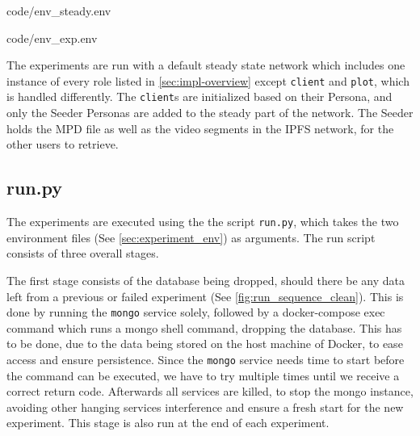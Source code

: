\noindent\begin{minipage}[t]{.40\textwidth}

                {code/env_steady.env}
\end{minipage}
\hfill
\begin{minipage}[t]{.51\textwidth}

                {code/env_exp.env}
\end{minipage}\bigskip

The experiments are run with a default steady state network which includes one instance of every role listed in \autoref{sec:impl-overview} except \texttt{client} and \texttt{plot}, which is handled differently. The \texttt{client}s are initialized based on their Persona, and only the Seeder Personas are added to the steady part of the network.
The Seeder holds the \ac{MPD} file as well as the video segments in the \ac{IPFS} network, for the other users to retrieve. 

\subsection{run.py}
\label{sec:experiment_run}
The experiments are executed using the the script \texttt{run.py}, which takes the two environment files (See \autoref{sec:experiment_env}) as arguments. The run script consists of three overall stages.

The first stage consists of the database being dropped, should there be any data left from a previous or failed experiment (See \autoref{fig:run_sequence_clean}). 
This is done by running the \texttt{mongo} service solely, followed by a docker-compose exec command which runs a mongo shell command, dropping the database. This has to be done, due to the data being stored on the host machine of Docker, to ease access and ensure persistence. 
Since the \texttt{mongo} service needs time to start before the command can be executed, we have to try multiple times until  we receive a correct return code. 
Afterwards all services are killed, to stop the mongo instance, avoiding other hanging services interference and ensure a fresh start for the new experiment. This stage is also run at the end of each experiment.




